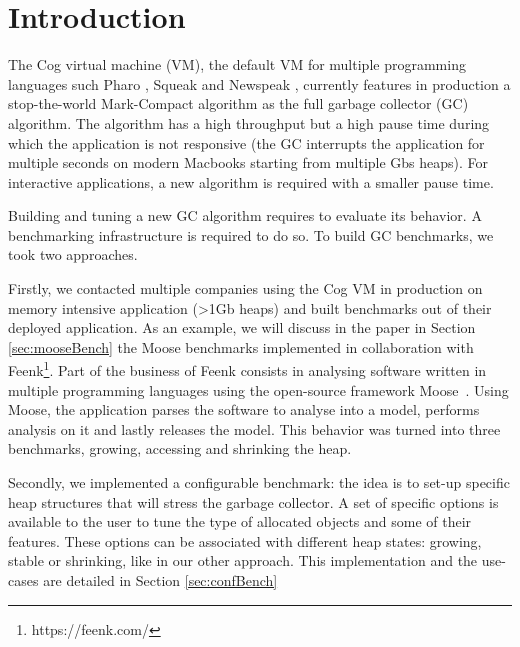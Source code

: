 \documentclass[10pt, sigplan]{acmart}
\newcommand{\todo}[1]{\color{orange}\fbox{\bfseries\sffamily\scriptsize TODO:}{\sf\small$\blacktriangleright$\textit{#1}$\blacktriangleleft$}\color{black}}
\begin{document}

\maketitle

\section{Introduction}
\label{sec:intro}

The Cog virtual machine (VM), the default VM for multiple programming languages such Pharo \cite{PharoByExample}, Squeak \cite{SqueakByExample} and Newspeak \cite{NewspeakOopsla}, currently features in production a stop-the-world Mark-Compact algorithm as the full garbage collector (GC) algorithm. The algorithm has a high throughput but a high pause time during which the application is not responsive (the GC interrupts the application for multiple seconds on modern Macbooks starting from multiple Gbs heaps). For interactive applications, a new algorithm is required with a smaller pause time.

Building and tuning a new GC algorithm requires to evaluate its behavior. A benchmarking infrastructure is required to do so. To build GC benchmarks, we took two approaches. 

Firstly, we contacted multiple companies using the Cog VM in production on memory intensive application (>1Gb heaps) and built benchmarks out of their deployed application. As an example, we will discuss in the paper in Section \ref{sec:mooseBench} the Moose benchmarks implemented in collaboration with Feenk\footnote{https://feenk.com/}. Part of the business of Feenk consists in analysing software written in multiple programming languages using the open-source framework Moose~\cite{MoosePaper1,MooseBook1}. Using Moose, the application parses the software to analyse into a model, performs analysis on it and lastly releases the model. This behavior was turned into three benchmarks, growing, accessing and shrinking the heap. 

Secondly, we implemented a configurable benchmark: the idea is to set-up specific heap structures that will stress the garbage collector. A set of specific options is available to the user to tune the type of allocated objects and some of their features. These options can be associated with different heap states: growing, stable or shrinking, like in our other approach. \todo{fin a ref}
This implementation and the use-cases are detailed in Section \ref{sec:confBench}
\end{document}
